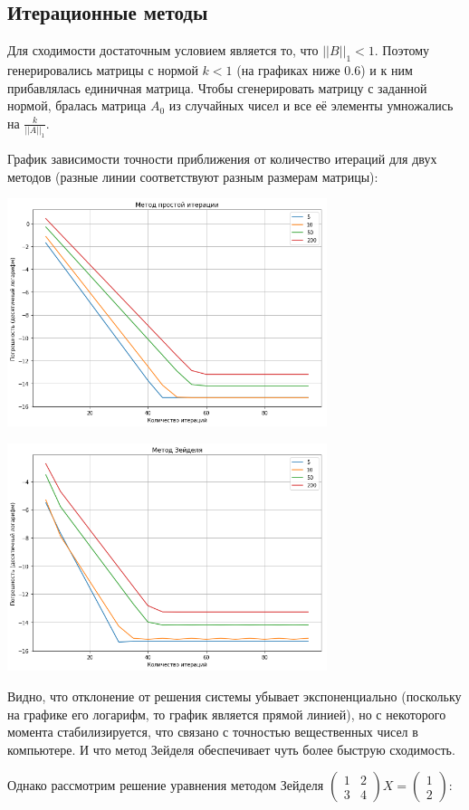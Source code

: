 \documentclass{article}
\begin{document}
\subsection{Итерационные методы}

Для сходимости достаточным условием является то, что $ ||B||_1 < 1$. Поэтому генерировались матрицы с нормой $k<1$ (на графиках ниже 0.6) и к ним прибавлялась единичная матрица. Чтобы сгенерировать матрицу с заданной нормой, бралась матрица $A_0$ из случайных чисел и все её элементы умножались на $\frac{k}{||A||_1}$.

График зависимости точности приближения от количество итераций для двух методов (разные линии соответствуют разным размерам матрицы):

\includegraphics[width=0.7\textwidth]{iter_1.png}

\includegraphics[width=0.7\textwidth]{iter_2.png}

Видно, что отклонение от решения системы убывает экспоненциально (поскольку на графике его логарифм, то график является прямой линией), но с некоторого момента стабилизируется, что связано с точностью вещественных чисел в компьютере. И что метод Зейделя обеспечивает чуть более быструю сходимость.

Однако рассмотрим решение уравнения методом Зейделя $\begin{pmatrix} 1 & 2 \\ 3 & 4 \end{pmatrix} X = \begin{pmatrix} 1 \\ 2 \end{pmatrix}$:
\end{document}
